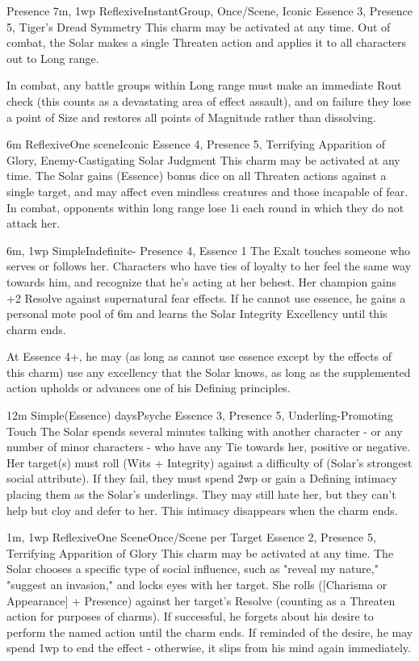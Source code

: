 \begin{Ability}{Presence}
  {7m, 1wp}
  {Reflexive}{Instant}{Group, Once/Scene, Iconic}
  {Essence 3, Presence 5, Tiger's Dread Symmetry}
  This charm may be activated at any time. Out of combat, the Solar makes a single Threaten action and applies it to all characters out to Long range.

  In combat, any battle groups within Long range must make an immediate Rout check (this counts as a devastating area of effect assault), and on failure they lose a point of Size and restores all points of Magnitude rather than dissolving.

  {6m}
  {Reflexive}{One scene}{Iconic}
  {Essence 4, Presence 5, Terrifying Apparition of Glory, Enemy-Castigating Solar Judgment}
  This charm may be activated at any time. The Solar gains (Essence) bonus dice on all Threaten actions against a single target, and may affect even mindless creatures and those incapable of fear. In combat, opponents within long range lose 1i each round in which they do not attack her.

  {6m, 1wp}
  {Simple}{Indefinite}{-}
  {Presence 4, Essence 1}
  The Exalt touches someone who serves or follows her. Characters who have ties of loyalty to her feel the same way towards him, and recognize that he's acting at her behest. Her champion gains +2 Resolve against supernatural fear effects. If he cannot use essence, he gains a personal mote pool of 6m and learns the Solar Integrity Excellency until this charm ends.

  At Essence 4+, he may (as long as cannot use essence except by the effects of this charm) use any excellency that the Solar knows, as long as the supplemented action upholds or advances one of his Defining principles.

  {12m}
  {Simple}{(Essence) days}{Psyche}
  {Essence 3, Presence 5, Underling-Promoting Touch}
  The Solar spends several minutes talking with another character - or any number of minor characters - who have any Tie towards her, positive or negative. Her target(s) must roll (Wits + Integrity) against a difficulty of (Solar's strongest social attribute). If they fail, they must spend 2wp or gain a Defining intimacy placing them as the Solar's underlings. They may still hate her, but they can't help but cloy and defer to her. This intimacy disappears when the charm ends.

  {1m, 1wp}
  {Reflexive}{One Scene}{Once/Scene per Target}
  {Essence 2, Presence 5, Terrifying Apparition of Glory}
  This charm may be activated at any time. The Solar chooses a specific type of social influence, such as "reveal my nature," "suggest an invasion," and locks eyes with her target. She rolls ([Charisma or Appearance] + Presence) against her target's Resolve (counting as a Threaten action for purposes of charms). If successful, he forgets about his desire to perform the named action until the charm ends. If reminded of the desire, he may spend 1wp to end the effect - otherwise, it slips from his mind again immediately.


\end{Ability}

